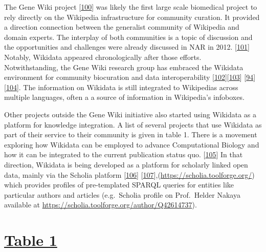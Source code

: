 The Gene Wiki project {[}\protect\hyperlink{ref-18UXATsxP}{100}{]} was likely the first large scale biomedical project to rely directly on the Wikipedia infrastructure for community curation.
It provided a direction connection between the generalist community of Wikipedia and domain experts.
The interplay of both communities is a topic of discussion and the opportunities and challenges were already discussed in NAR in 2012. {[}\protect\hyperlink{ref-13LWXQF0E}{101}{]}\\
Notably, Wikidata appeared chronologically after those efforts.\\
Notwithstanding, the Gene Wiki research group has embraced the Wikidata environment for community biocuration and data interoperability {[}\protect\hyperlink{ref-2ZhxC0dg}{102}{]}{[}\protect\hyperlink{ref-DaJdrXLk}{103}{]} {[}\protect\hyperlink{ref-3GqlN9Dk}{94}{]} {[}\protect\hyperlink{ref-aQfGxPRH}{104}{]}.
The information on Wikidata is still integrated to Wikipedias across multiple languages, often a a source of information in Wikipedia's infoboxes.

Other projects outside the Gene Wiki initiative also started using Wikidata as a platform for knowledge integration.
A list of several projects that use Wikidata as part of their service to their community is given in table 1.
There is a movement exploring how Wikidata can be employed to advance Computational Biology and how it can be integrated to the current publication status quo. {[}\protect\hyperlink{ref-1GijvCQtv}{105}{]}
In that direction, Wikidata is being developed as a platform for scholarly linked open data, mainly via the Scholia platform {[}\protect\hyperlink{ref-hxzL9pmm}{106}{]} {[}\protect\hyperlink{ref-PdG2G4Bp}{107}{]},(\url{https://scholia.toolforge.org/}) which provides profiles of pre-templated SPARQL queries for entities like particular authors and articles (e.g.~Scholia profile on Prof.~Helder Nakaya available at \url{https://scholia.toolforge.org/author/Q42614737}).

\hypertarget{table-1}{%
\section{\texorpdfstring{\href{https://docs.google.com/spreadsheets/d/1loPE0bfJsih4eLrwNGvQf2c-9_I8z-GEvV21496o8h8/edit\#gid=0}{Table 1}}{Table 1}}\label{table-1}}

